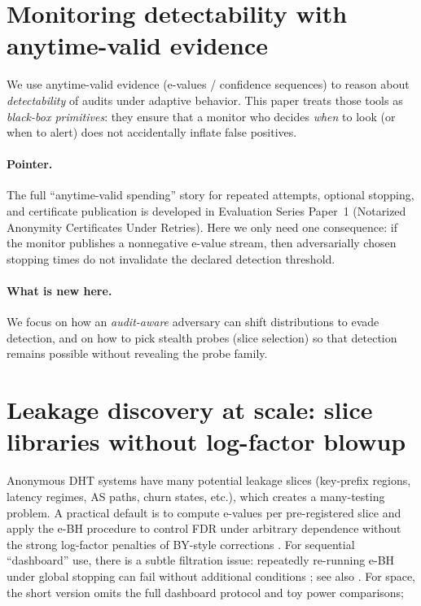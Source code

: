 \documentclass[11pt]{article}
\begin{document}
\section{Monitoring detectability with anytime-valid evidence}
We use anytime-valid evidence (e-values / confidence sequences) to reason about \emph{detectability} of audits under adaptive behavior.
This paper treats those tools as \emph{black-box primitives}: they ensure that a monitor who decides \emph{when} to look (or when to alert) does not accidentally inflate false positives.

\paragraph{Pointer.}
The full ``anytime-valid spending'' story for repeated attempts, optional stopping, and certificate publication is developed in Evaluation Series Paper~1 (Notarized Anonymity Certificates Under Retries).
Here we only need one consequence: if the monitor publishes a nonnegative e-value stream, then adversarially chosen stopping times do not invalidate the declared detection threshold.

\paragraph{What is new here.}
We focus on how an \emph{audit-aware} adversary can shift distributions to evade detection, and on how to pick stealth probes (slice selection) so that detection remains possible without revealing the probe family.

\section{Leakage discovery at scale: slice libraries without log-factor blowup}
Anonymous DHT systems have many potential leakage slices (key-prefix regions, latency regimes, AS paths, churn states, etc.), which creates a many-testing problem.
A practical default is to compute e-values per pre-registered slice and apply the e-BH procedure \cite{wangramdas2022ebh} to control FDR under arbitrary dependence without the strong log-factor penalties of BY-style corrections \cite{benjamini2001by}.
For sequential ``dashboard'' use, there is a subtle filtration issue: repeatedly re-running e-BH under global stopping can fail without additional conditions \cite{stopped_ebh_2025}; see also \cite{xu2024online_evalues}.
For space, the short version omits the full dashboard protocol and toy power comparisons; 
\end{document}
